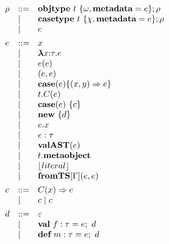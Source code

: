 \begin{figure}
\centering
\[
\begin{array}[t]{lll} 
\rho & \bnfdef & \keyw{objtype}~ t~ \{ \omega, \keyw{metadata}=e \}; \rho \\
     & \bnfalt & \keyw{casetype}~ t~ \{ \chi, \keyw{metadata}=e \}; \rho\\
     & \bnfalt & e
     \\[1ex]
e    & \bnfdef & x \\
     & \bnfalt & \boldsymbol\lambda x{:}\tau . e \\ %
     & \bnfalt & e(e) \\
     & \bnfalt & (e, e) \\
     & \bnfalt & \keyw{case}(e) \{(x, y) \Rightarrow e\}\\
     & \bnfalt & t.C(e) \\
     & \bnfalt & \keyw{case}(e)~\{ c \} \\
     & \bnfalt & \keyw{new}~ \{ d \}\\
     & \bnfalt & e.x \\
     & \bnfalt & e : \tau\\
     & \bnfalt & \keyw{valAST}(e) \\
     & \bnfalt & t.\keyw{metaobject}\\
     & \bnfalt & \lfloor literal \rfloor \\
     & \bnfalt & \keyw{fromTS}[\Gamma](e, e)
\\[1ex]	
c    & \bnfdef & C(x) \Rightarrow e\\
     & \bnfalt & c \bnfalt c
	 \\[1ex]
d   & \bnfdef & \varepsilon \\
     & \bnfalt & \keyw{val}~ f:\tau = e;~d \\
     & \bnfalt & \keyw{def}~ m:\tau = e;~d
\\[1ex] 
\end{array}
\begin{array}[t]{lll}
~~~
\end{array}
\begin{array}[t]{lll}



\end{array}\]
\end{figure}
